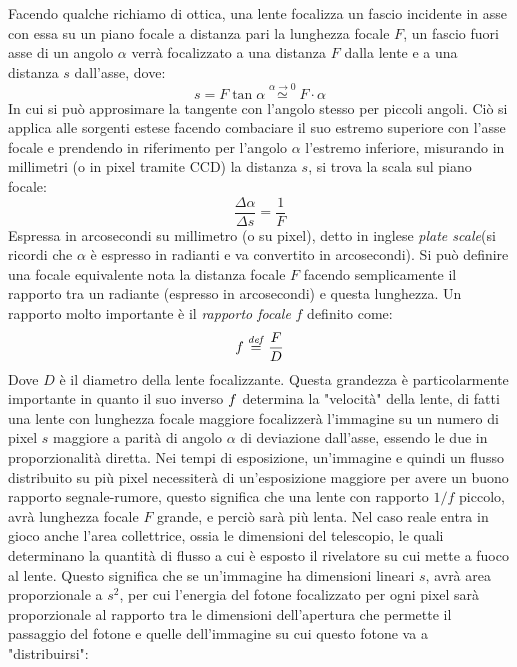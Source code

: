 Facendo qualche richiamo di ottica, una lente focalizza un fascio incidente in asse con essa su un piano focale a distanza pari la lunghezza focale $F$, un fascio fuori asse di un angolo $\alpha$ verrà focalizzato a una distanza $F$ dalla lente e a una distanza $s$ dall'asse, dove:
\begin{equation*}
	s = F\tan\alpha \overset{\alpha\to0}{\simeq} F\cdot\alpha
\end{equation*}
In cui si può approsimare la tangente con l'angolo stesso per piccoli angoli. Ciò si applica alle sorgenti estese facendo combaciare il suo estremo superiore con l'asse focale e prendendo in riferimento per l'angolo $\alpha$ l'estremo inferiore, misurando in millimetri  (o in pixel tramite CCD) la distanza $s$, si trova la scala sul piano focale:
\begin{equation*}
	\frac{\Delta\alpha}{\Delta s} = \frac{1}{F}
\end{equation*}
Espressa in arcosecondi su millimetro (o su pixel), detto in inglese \textit{plate scale}(si ricordi che $\alpha$ è espresso in radianti e va convertito in arcosecondi). Si può definire una focale equivalente nota la distanza focale $F$ facendo semplicamente il rapporto tra un radiante (espresso in arcosecondi) e questa lunghezza. Un rapporto molto importante è il \textit{rapporto focale} $f$ definito come:
\begin{equation}
	\label{def:f-ratio}
	f \overset{\mathit{def}}{=} \frac{F}{D}
\end{equation}
Dove $D$ è il diametro della lente focalizzante. Questa grandezza è particolarmente importante in quanto il suo inverso $\/f$ determina la "velocità" della lente, di fatti una lente con lunghezza focale maggiore focalizzerà l'immagine su un numero di pixel $s$ maggiore a parità di angolo $\alpha$ di deviazione dall'asse, essendo le due in proporzionalità diretta. Nei tempi di esposizione, un'immagine e quindi un flusso distribuito su più pixel necessiterà di un'esposizione maggiore per avere un buono rapporto segnale-rumore, questo significa che una lente con rapporto $1/f$ piccolo, avrà lunghezza focale $F$ grande, e perciò sarà più lenta. Nel caso reale entra in gioco anche l'area collettrice, ossia le dimensioni del telescopio, le quali determinano la quantità di flusso a cui è esposto il rivelatore su cui mette a fuoco al lente. Questo significa che se un'immagine ha dimensioni lineari $s$, avrà area proporzionale a $s^2$, per cui l'energia del fotone focalizzato per ogni pixel sarà proporzionale al rapporto tra le dimensioni dell'apertura che permette il passaggio del fotone e quelle dell'immagine su cui questo fotone va a "distribuirsi":
